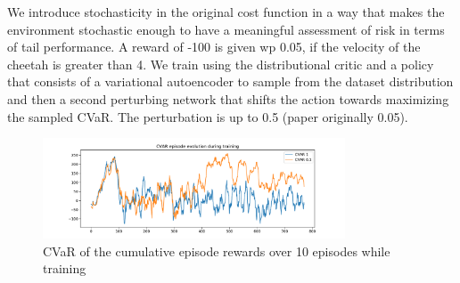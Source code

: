 We introduce stochasticity in the original cost function in a way that 
makes the environment stochastic enough to have a meaningful assessment of risk in terms of 
tail performance.
A reward of -100 is given wp 0.05, if the velocity of the cheetah is greater than 4.
We train using the distributional critic and a policy that consists of a variational autoencoder
to sample from the dataset distribution and then a second perturbing network that shifts the
action towards maximizing the sampled CVaR.
The perturbation is up to 0.5 (paper originally 0.05).

\begin{figure}[ht]
        \centering
        \includegraphics[width=0.8\textwidth]{images/Cheetah_offpolicy_medium/cvar_train.pdf}
        \caption{CVaR of the cumulative episode rewards over 10 episodes while training}
        \label{cvar_cheetah}
    
\end{figure}
